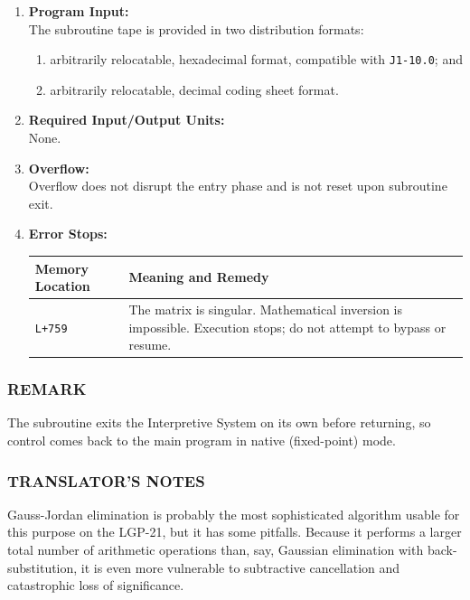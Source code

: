 \begin{enumerate}[leftmargin=1.5em, itemsep=6pt]
    \item \textbf{Program Input:} \\
    The subroutine tape is provided in two distribution formats:
    \begin{enumerate}[label=\alph*), itemsep=2pt, topsep=2pt]
        \item arbitrarily relocatable, hexadecimal format, compatible with \texttt{J1-10.0}; and
        \item arbitrarily relocatable, decimal coding sheet format.
    \end{enumerate}
    
    \item \textbf{Required Input/Output Units:} \\
    None.
    
    \item \textbf{Overflow:} \\
    Overflow does not disrupt the entry phase and is not reset upon subroutine exit.
    
    \item \textbf{Error Stops:} \\
    \begin{tabularx}{\textwidth}{lX}
        \toprule
        \textbf{Memory Location} & \textbf{Meaning and Remedy} \\
        \midrule
        \texttt{L+759}           & The matrix is singular. Mathematical inversion is impossible. Execution stops; do not attempt to bypass or resume. \\
        \bottomrule
    \end{tabularx}
\end{enumerate}

\subsubsection*{REMARK}
The subroutine exits the Interpretive System on its own before returning, so control comes back to the main program in native (fixed-point) mode.

\subsubsection*{TRANSLATOR'S NOTES}
Gauss-Jordan elimination is probably the most sophisticated algorithm usable for this purpose on the LGP-21, but it has some pitfalls. Because it performs a larger total number of arithmetic operations than, say, Gaussian elimination with back-substitution, it is even more vulnerable to subtractive cancellation and catastrophic loss of significance.

